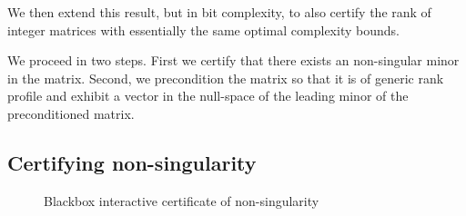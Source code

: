 \documentclass{article}
\let\oldresizebox\resizebox
\renewcommand{\resizebox}[3]{\oldresizebox{\linewidth}{!}{#3}}
\begin{document}
We then extend this result, but in bit complexity, to also certify the rank of
integer matrices with essentially the same optimal complexity bounds.

We proceed in two steps. First we certify that there exists an
 non-singular minor in the matrix. Second, we precondition the matrix
so that it is of generic rank profile and exhibit a vector in the null-space of
the leading  minor of the preconditioned matrix. 
 
\subsection{Certifying non-singularity}


\begin{figure*}[htbp]\center 
  \noindent\resizebox{.65\linewidth}{!}{
  }
  \caption{Blackbox interactive certificate of non-singularity}\label{fig:nonsing} 
\end{figure*}
\end{document}
